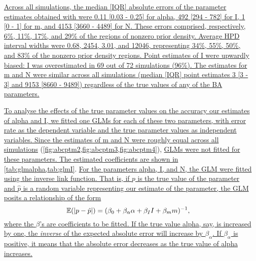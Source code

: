 {\color{blue}
\uline{Across all simulations, the median [\gls{IQR}] absolute errors of the parameter 
estimates obtained with  were
    0.11 
    [0.03 - 
    0.25]
for \gls{alpha},
    492 
    [294 - 
    782]
for \gls{I},
    1 
    [0 - 
    1]
for \gls{m}, and
    4153 
    [3660 - 
    4489]
for \gls{N}. These errors comprised, respectively,
    6\%,
    11\%,
    17\%, and
    29\%
of the regions of nonzero prior density. Average \gls{HPD} interval widths were
    0.68,
    2454,
    3.01, and
    12046,
representing 
    34\%,
    55\%,
    50\%, and
    83\%
of the nonzero prior density regions. Point estimates of \gls{I} were upwardly
biased: \gls{I} was overestimated in
    69
out of 
    72
simulations
    (96\%).
The estimates for \gls{m} and \gls{N} were similar across all simulations
(median [IQR] point estimates
    3
    [3 - 
    3]
and 
    9153
    [8660 - 
    9489])
regardless of the true values of any of the \gls{BA} parameters.}

\uline{To analyse the effects of the true parameter values on the
accuracy our estimates of \gls{alpha} and \gls{I}, we fitted one \glspl{GLM}
for each of these two parameters, with error rate as the dependent variable and
the true parameter values as independent variables. Since the estimates of
\gls{m} and \gls{N} were roughly equal across all simulations}
(\cref{fig:abcptm2,fig:abcptm3,fig:abcptm4}), \uline{\glspl{GLM} were not
fitted for these parameters. The estimated coefficients are shown in
}\cref{tab:glmalpha,tab:glmI}. \uline{For the parameters \gls{alpha}, \gls{I},
and \gls{N}, the \gls{GLM} were fitted using the inverse link function. That
is, if $p$ is the true value of the parameter and $\hat{p}$ is a random
variable representing our estimate of the parameter, the \gls{GLM} posits a
relationship of the form }
\[
    \mathbb{E}(|p-\hat{p}|) = (\beta_0 + \beta_\alpha \alpha + \beta_I I + \beta_m m)^{-1},
\]
\uline{where the $\beta$'s are coefficients to be fitted. If the true value
\gls{alpha}, say, is increased by one, the \emph{inverse} of the expected
absolute error will increase by $\beta_\alpha$. If $\beta_\alpha$ is positive,
it means that the absolute error decreases as the true value of \gls{alpha}
increases.}}




